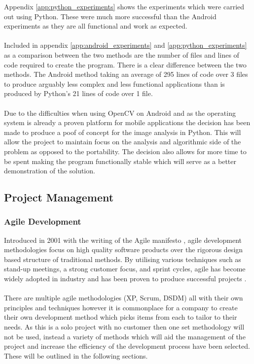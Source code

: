 		Appendix \ref{app:python_experiments} shows the experiments which were carried out using Python. These were much more successful than the Android experiments as they are all functional and work as expected.
		\\\\
		Included in appendix \ref{app:android_experiments} and \ref{app:python_experiments} as a comparison between the two methods are the number of files and lines of code required to create the program. There is a clear difference between the two methods. The Android method taking an average of 295 lines of code over 3 files to produce arguably less complex and less functional applications than is produced by Python's 21 lines of code over 1 file.
		\\\\
		Due to the difficulties when using OpenCV on Android and as the operating system is already a proven platform for mobile applications the decision has been made to produce a poof of concept for the image analysis in Python. This will allow the project to maintain focus on the analysis and algorithmic side of the problem as opposed to the portability. The decision also allows for more time to be spent making the program functionally stable which will serve as a better demonstration of the solution.
\subsection{Project Management}
	\subsubsection{Agile Development}
		Introduced in 2001 with the writing of the Agile manifesto \citep{beck2001manifesto}, agile development methodologies focus on high quality software products over the rigorous design based structure of traditional methods. By utilising various techniques such as stand-up meetings, a strong customer focus, and sprint cycles, agile has become widely adopted in industry and has been proven to produce successful projects \citep{state_of_agile_2015}.
		\\\\
		There are multiple agile methodologies (XP, Scrum, DSDM) all with their own principles and techniques however it is commonplace for a company to create their own development method which picks items from each to tailor to their needs. As this is a solo project with no customer then one set methodology will not be used, instead a variety of methods which will aid the management of the project and increase the efficiency of the development process have been selected. These will be outlined in the following sections.
